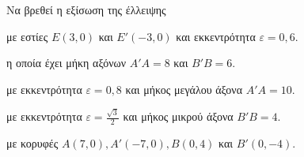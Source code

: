Να βρεθεί η εξίσωση της έλλειψης
\begin{alist}
\item με εστίες $ E(3,0) $ και $ E'(-3,0) $ και εκκεντρότητα $\varepsilon=0{,}6$.
\item η οποία έχει μήκη αξόνων $ A'A=8 $ και $ B'B=6 $.
\item με εκκεντρότητα $\varepsilon=0{,}8$ και μήκος μεγάλου άξονα $ A'A=10 $.
\item με εκκεντρότητα $ \varepsilon=\frac{\sqrt{3}}{2} $ και μήκος μικρού άξονα $ B'B=4 $.
\item με κορυφές $ A(7,0),A'(-7,0),B(0,4) $ και $ Β'(0,-4) $.
\end{alist}
